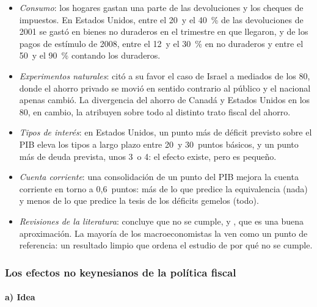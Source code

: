 \documentclass[11pt]{article}
\begin{document}
\begin{itemize}
\item \emph{Consumo}: los hogares gastan una parte de las devoluciones y los cheques de impuestos. En Estados Unidos, entre el 20~y el 40~\% de las devoluciones de 2001 se gastó en bienes no duraderos en el trimestre en que llegaron\nocite{JohnsonParkerSouleles2006Household}, y de los pagos de estímulo de 2008, entre el 12~y el 30~\% en no duraderos y entre el 50~y el 90~\% contando los duraderos\nocite{ParkerEtAl2013Consumer}.
\item \emph{Experimentos naturales}: \textcite{Barro1989Ricardian} citó a su favor el caso de Israel a mediados de los 80, donde el ahorro privado se movió en sentido contrario al público y el nacional apenas cambió. La divergencia del ahorro de Canadá y Estados Unidos en los 80, en cambio, la atribuyen \textcite{CarrollSummers1987Why} sobre todo al distinto trato fiscal del ahorro.
\item \emph{Tipos de interés}: en Estados Unidos, un punto más de déficit previsto sobre el PIB eleva los tipos a largo plazo entre 20~y 30~puntos básicos, y un punto más de deuda prevista, unos 3~o 4\nocite{Laubach2009New}: el efecto existe, pero es pequeño.
\item \emph{Cuenta corriente}: una consolidación de un punto del PIB mejora la cuenta corriente en torno a 0,6~puntos\nocite{BluedornLeigh2011Revisiting}: más de lo que predice la equivalencia (nada) y menos de lo que predice la tesis de los déficits gemelos (todo).
\item \emph{Revisiones de la literatura}: \textcite{Bernheim1987Ricardian} concluye que no se cumple, y \textcite{Seater1993Ricardian}, que es una buena aproximación. La mayoría de los macroeconomistas la ven como un punto de referencia: un resultado limpio que ordena el estudio de por qué no se cumple\nocite{Romer2019Advanced}.
\end{itemize}

\subsubsection{Los efectos no keynesianos de la política fiscal}\label{sec:no-keynesianos}

\paragraph{a) Idea}
\end{document}
